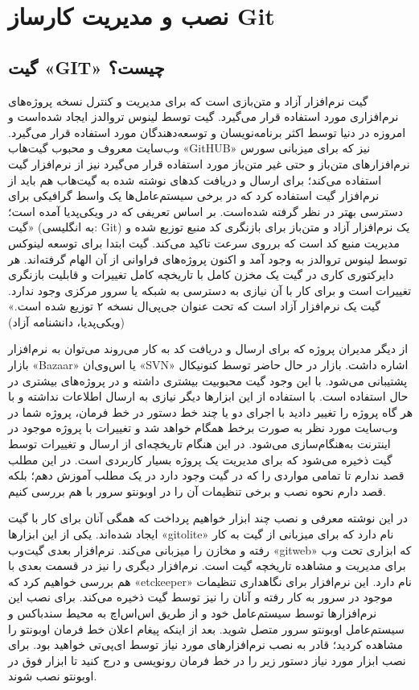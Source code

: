 \chapter{نصب و مدیریت کارساز Git}
\section{گیت «GIT» چیست؟}
گیت نرم‌افزار آزاد و متن‌بازی است که برای مدیریت و کنترل نسخه پروژه‌های نرم‌افزاری مورد استفاده قرار می‌گیرد. گیت توسط لینوس تروالدز ایجاد شده‌است و امروزه در دنیا توسط اکثر برنامه‌نویسان و توسعه‌دهندگان مورد استفاده قرار می‌گیرد. وب‌سایت معروف و محبوب گیت‌هاب «GitHUB» نیز که برای میزبانی سورس نرم‌افزارهای متن‌باز و حتی غیر متن‌باز مورد استفاده قرار می‌گیرد نیز از نرم‌افزار گیت استفاده می‌کند؛ برای ارسال و دریافت کدهای نوشته شده به گیت‌هاب هم باید از نرم‌افزار گیت استفاده کرد که در برخی سیستم‌عامل‌ها یک واسط گرافیکی برای دسترسی بهتر در نظر گرفته شده‌است. بر اساس تعریفی که در ویکی‌پدیا آمده است؛ «گیت (به انگلیسی: Git) یک نرم‌افزار آزاد و متن‌باز برای بازنگری کد منبع توزیع شده و مدیریت منبع کد است که برروی سرعت تاکید می‌کند. گیت ابتدا برای توسعه لینوکس توسط لینوس تروالدز به وجود آمد و اکنون پروژه‌های فراوانی از آن الهام گرفته‌اند. هر دایرکتوری کاری در گیت یک مخزن کامل با تاریخچه کامل تغییرات و قابلیت بازنگری تغییرات است و برای کار با آن نیازی به دسترسی به شبکه یا سرور مرکزی وجود ندارد. گیت یک نرم‌افزار آزاد است که تحت عنوان جی‌پی‌ال نسخه ۲ توزیع شده است.» (ویکی‌پدیا، دانشنامه آزاد)

از دیگر مدیران پروژه که برای ارسال و دریافت کد به کار می‌روند می‌توان به نرم‌افزار بازار «Bazaar» یا اس‌وی‌ان «SVN» اشاره داشت. بازار در حال حاضر توسط کنونیکال پشتیبانی می‌شود. با این وجود گیت محبوبیت بیشتری داشته و در پروژه‌های بیشتری در حال استفاده است. با استفاده از این ابزارها دیگر نیازی به ارسال اطلاعات نداشته و با هر گاه پروژه را تغییر دادید با اجرای دو یا چند خط دستور  در خط فرمان، پروژه شما در وب‌سایت مورد نظر به صورت برخط همگام خواهد شد و تغییرات با پروژه موجود در اینترنت به‌هنگام‌سازی می‌شود. در این هنگام تاریخچه‌ای از ارسال و تغییرات توسط گیت ذخیره می‌شود که برای مدیریت یک پروژه بسیار کاربردی است.  در این مطلب قصد ندارم تا تمامی مواردی را که در گیت وجود دارد در یک مطلب آموزش دهم؛ بلکه قصد دارم نحوه نصب و برخی تنظیمات آن را در اوبونتو سرور با هم بررسی کنیم.

در این نوشته معرفی و نصب چند ابزار خواهیم پرداخت که همگی آنان برای کار با گیت ایجاد شده‌اند. یکی از این ابزارها «gitolite» نام دارد که برای میزبانی از گیت به کار رفته و مخازن را میزبانی می‌کند. نرم‌افزار بعدی گیت‌وب «gitweb» که ابزاری تحت وب برای مدیریت و مشاهده تاریخچه گیت است. نرم‌افزار دیگری را نیز در قسمت بعدی با هم بررسی خواهیم کرد که «etckeeper» نام دارد. این نرم‌افزار برای نگاهداری تنظیمات موجود در سرور به کار رفته و آنان را  نیز توسط گیت ذخیره می‌کند.
برای نصب این نرم‌افزارها توسط سیستم‌عامل خود و از طریق اس‌اس‌اچ به محیط سندباکس و سیستم‌عامل اوبونتو سرور متصل شوید. بعد از اینکه پیغام اعلان خط فرمان اوبونتو را مشاهده کردید؛ قادر به نصب نرم‌افزارهای مورد نیاز توسط ای‌پی‌تی خواهید بود. برای نصب ابزار مورد نیاز دستور زیر را در خط فرمان رونویسی و درج کنید تا ابزار فوق در اوبونتو نصب شوند.
\newline

